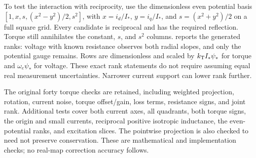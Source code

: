 To test the interaction with reciprocity, use the dimensionless even
potential basis $[1,x,s,(x^2-y^2)/2,s^2]$, with
$x=i_d/I_*$, $y=i_q/I_*$, and $s=(x^2+y^2)/2$ on a full square grid.
Every candidate is reciprocal and has the required reflection.
Torque still annihilates the constant, $s$, and $s^2$ columns.
 reports the generated ranks: voltage with known
resistance observes both radial slopes, and only the potential gauge remains.
Rows are dimensionless and scaled by $k_{\rm T}I_*\psi_*$ for torque and
$\omega_e\psi_*$ for voltage. These exact rank statements do not require
assuming equal real measurement uncertainties. Narrower current support
can lower rank further.

\begin{table}[htbp]
 \centering
 
 \caption{Generated observation ranks for the five-column reciprocal,
 even potential example. Torque alone leaves two radial modes besides
 gauge; fixing gauge alone would not recover them.}
 \label{tab:torque-rank}
\end{table}

The original forty torque checks are retained, including weighted projection,
rotation, current noise, torque offset/gain, loss terms, resistance signs,
and joint rank. Additional tests cover both current axes, all quadrants,
both torque signs, the origin and small currents, reciprocal positive
isotropic inductance, the even-potential ranks, and excitation slices.
The pointwise projection is also checked to need not preserve conservation.
These are mathematical and implementation checks; no real-map correction
accuracy follows.
